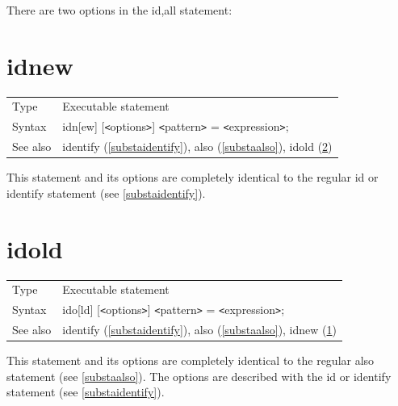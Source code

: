There are two options in the id,all statement: \hfill \\
\vspace{10mm}


\section{idnew}
\label{substaidnew}

\noindent \begin{tabular}{ll}
Type & Executable statement\\
Syntax & idn[ew] [{\tt<}options{\tt>}] {\tt<}pattern{\tt>} = {\tt<}expression{\tt>};
\\ See also & identify (\ref{substaidentify}),
              also (\ref{substaalso}),
              idold (\ref{substaidold})
\end{tabular} \vspace{4mm}

\noindent This statement and its options are completely 
identical to the regular id or identify statement 
(see \ref{substaidentify}). \vspace{10mm}


\section{idold}
\label{substaidold}

\noindent \begin{tabular}{ll}
Type & Executable statement\\
Syntax & ido[ld] [{\tt<}options{\tt>}] {\tt<}pattern{\tt>} = {\tt<}expression{\tt>};
\\ See also & identify (\ref{substaidentify}),
              also (\ref{substaalso}),
              idnew (\ref{substaidnew})
\end{tabular}\vspace{4mm}

\noindent This statement and its options are completely 
identical to the regular also statement (see \ref{substaalso}). 
The options are described with the id or identify 
statement (see \ref{substaidentify}).
\vspace{10mm}

